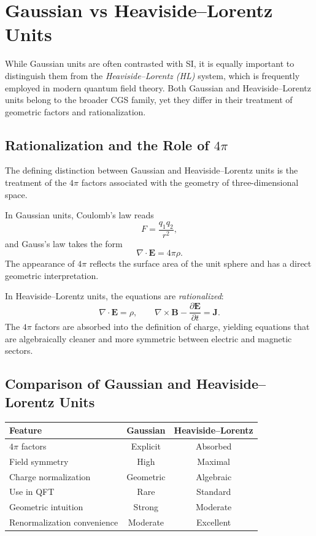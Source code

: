 \documentclass[12pt]{article}
\begin{document}
\section{Gaussian vs Heaviside--Lorentz Units}

While Gaussian units are often contrasted with SI, it is equally important to distinguish them from the \emph{Heaviside–Lorentz (HL)} system, which is frequently employed in modern quantum field theory. Both Gaussian and Heaviside–Lorentz units belong to the broader CGS family, yet they differ in their treatment of geometric factors and rationalization.

\subsection{Rationalization and the Role of $4\pi$}

The defining distinction between Gaussian and Heaviside–Lorentz units is the treatment of the $4\pi$ factors associated with the geometry of three-dimensional space.

In Gaussian units, Coulomb’s law reads
\[
F = \frac{q_1 q_2}{r^2},
\]
and Gauss’s law takes the form
\[
\nabla \cdot \mathbf{E} = 4\pi \rho.
\]
The appearance of $4\pi$ reflects the surface area of the unit sphere and has a direct geometric interpretation.

In Heaviside–Lorentz units, the equations are \emph{rationalized}:
\[
\nabla \cdot \mathbf{E} = \rho,
\qquad
\nabla \times \mathbf{B} - \frac{\partial \mathbf{E}}{\partial t} = \mathbf{J}.
\]
The $4\pi$ factors are absorbed into the definition of charge, yielding equations that are algebraically cleaner and more symmetric between electric and magnetic sectors.

\subsection{Comparison of Gaussian and Heaviside–Lorentz Units}

\begin{center}
\begin{tabular}{lcc}
\hline
Feature & Gaussian & Heaviside--Lorentz \\
\hline
$4\pi$ factors & Explicit & Absorbed \\
Field symmetry & High & Maximal \\
Charge normalization & Geometric & Algebraic \\
Use in QFT & Rare & Standard \\
Geometric intuition & Strong & Moderate \\
Renormalization convenience & Moderate & Excellent \\
\hline
\end{tabular}
\end{center}
\end{document}
